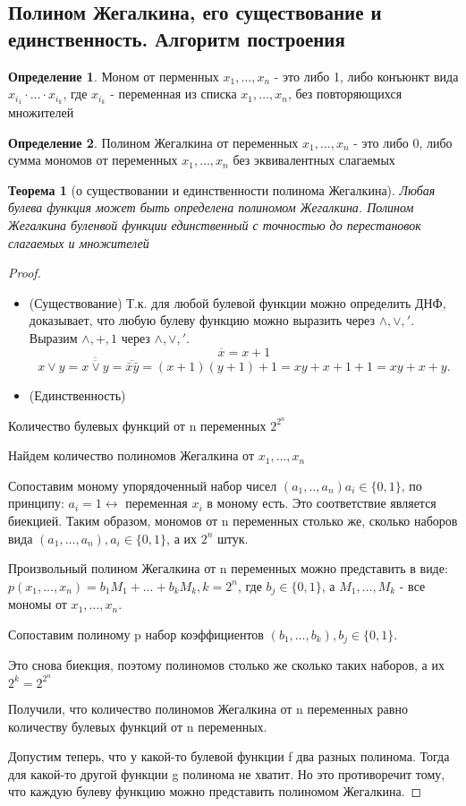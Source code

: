 \documentclass[a4paper]{article}
\newtheorem{theorem}{Теорема}[section]
\theoremstyle{definition}
\newtheorem*{definition}{Определение}
\theoremstyle{remark}
\begin{document}
    \subsection{Полином Жегалкина, его существование и единственность. Алгоритм построения}
	\begin{definition}
		Моном от перменных $x_1, \dots , x_n$ - это либо 1, либо конъюнкт вида $x_{i_1} \cdot \dots  \cdot x_{i_k}$, где $x_{i_k}$ - переменная из списка $x_1, \dots , x_n$, без повторяющихся множителей
	\end{definition}
	\begin{definition}
		Полином Жегалкина от переменных $x_1, \dots , x_n$ - это либо 0, либо сумма мономов от переменных $x_1, \dots , x_n$ без эквивалентных слагаемых
	\end{definition}
	\begin{theorem}[о существовании и единственности полинома Жегалкина]
		Любая булева функция может быть определена полиномом Жегалкина. Полином Жегалкина буленвой функции единственный с точностью до перестановок слагаемых и множителей
	\end{theorem}
	\begin{proof}
        \begin{itemize}
            \item (Существование) Т.к. для любой булевой функции можно определить ДНФ, доказывает, что любую булеву функцию можно выразить через $\wedge, \vee, '$. Выразим  $\wedge, +, 1$ через
            $\wedge, \vee, '$. $$\overline{x} = x + 1$$ $$x \vee y = \overline{\overline{x \vee y}} = \overline{\bar{x}\bar{y}} = (x+1)(y+1) + 1 = xy + x + 1 + 1 = xy + x + y.$$
            \item (Единственность)
        \end{itemize}Количество булевых функций от n переменных $2^{2^n}$
		
		Найдем количество полиномов Жегалкина от $x_1, \dots , x_n$
		
		Сопоставим моному упорядоченный набор чисел $(a_1, .., a_n) a_i \in \{0, 1\}$, по принципу: $a_i = 1 \leftrightarrow$ переменная $x_i$ в моному есть. Это соответствие является биекцией. Таким образом, мономов от n переменных столько же, сколько наборов вида $(a_1, \dots , a_n), a_i \in \{0, 1\}$, а их $2^n$ штук.
		
		Произвольный полином Жегалкина от n переменных можно представить в виде: $p(x_1, \dots , x_n) = b_1M_1 + \dots  + b_kM_k, k = 2^n$, где $b_j \in \{0, 1\}$, а $M_1, \dots , M_k$ - все мономы от $x_1, \dots , x_n$.
		
		Сопоставим полиному p набор коэффициентов $(b_1, \dots , b_k), b_j \in \{0, 1\}.$
		
		Это снова биекция, поэтому полиномов столько же сколько таких наборов, а их $2^k = 2^{2^n}$
		
		Получили, что количество полиномов Жегалкина от n переменных равно количеству булевых функций от n переменных.
		
		Допустим теперь, что у какой-то булевой функции f два разных полинома. Тогда для какой-то другой функции g полинома не хватит. Но это противоречит тому, что каждую булеву функцию можно представить полиномом Жегалкина.
	\end{proof}
\end{document}
